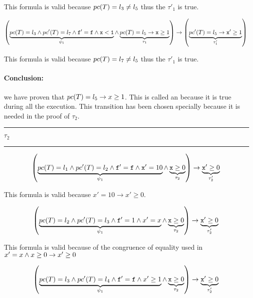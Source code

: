 \begin{example}
	This formula is valid because $pc(T) = l_3 \neq l_5$ thus the $\tau'_1$ is true.

	\[
		\left(
			\underbrace{pc(T) = l_3 \wedge pc'(T) = l_7 \wedge \mathtt{f'=f} \wedge \mathtt{x<1}}_{\psi_1} \wedge \underbrace{pc(T) = l_5 \to \mathtt{x} \geq 1}_{\tau_1}
		\right) 
			\to \left(\underbrace{pc'(T) = l_5 \to \mathtt{x}' \geq 1}_{\tau_1'}\right)\\\\
	\]

	This formula is valid because $pc(T) = l_7 \neq l_5$ thus the $\tau'_1$ is true.


\paragraph{Conclusion:} we have proven that $pc(T) = l_5 \to x \geq 1$. 
%
This is called an  because it is true during all the execution. 
%
This transition has been chosen specially because it is needed in the proof of $\tau_2$.

\begin{center}\rule{4cm}{0.4pt}  $\tau_2$  \rule{4cm}{0.4pt}\end{center}

	\[
		\left(
			\underbrace{pc(T) = l_1 \wedge pc'(T) = l_2 \wedge \mathtt{f'=f} \wedge \mathtt{x}' = 10}_{\psi_1} \wedge \underbrace{\mathtt{x} \geq 0}_{\tau_2}
		\right) 
				\to  \underbrace{\mathtt{x}' \geq 0}_{\tau_2'}\\\\
	\]

	This formula is valid because $x'=10 \to x'\geq 0$.

	\[
		\left(
			\underbrace{pc(T) = l_2 \wedge pc'(T) = l_3 \wedge \mathtt{f}' = 1 \wedge x'=x}_{\psi_1} \wedge \underbrace{\mathtt{x} \geq 0}_{\tau_2}
		\right) 
			\to \underbrace{\mathtt{x}' \geq 0}_{\tau_2'}\\\\
	\]


	This formula is valid because of the congruence of equality used in  $x'=x \wedge x\geq 0 \to x'\geq 0$ 

	\[
		\left(
			\underbrace{pc(T) = l_3 \wedge pc'(T) = l_4 \wedge \mathtt{f'=f} \wedge x'\geq 1}_{\psi_1} \wedge \underbrace{\mathtt{x} \geq 0}_{\tau_2}
		\right) 
			\to \underbrace{\mathtt{x}' \geq 0}_{\tau_2'}\\\\
	\]


\end{example}
